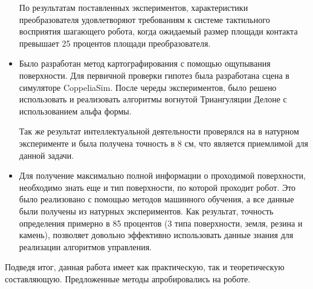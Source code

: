 \begin{itemize}
  По результатам поставленных экспериментов, характеристики преобразователя удовлетворяют требованиям к системе тактильного восприятия шагающего робота, когда ожидаемый размер площади контакта превышает 25 процентов площади преобразователя.
  \item Было разработан метод картографирования с помощью ощупывания поверхности. Для первичной проверки гипотез была разработана сцена в симуляторе CoppeliaSim. После череды экспериментов, было решено использовать и реализовать алгоритмы вогнутой Триангуляции Делоне с использованием альфа формы.

  Так же результат интеллектуальной деятельности проверялся на в натурном эксперименте и была получена точность в 8 см, что является приемлимой для данной задачи.
  \item Для получение максимально полной информации о проходимой поверхности, необходимо знать еще и тип поверхности, по которой проходит робот. Это было реализовано с помощью методов машинного обучения, а все данные были получены из натурных экспериментов. Как результат, точность определения примерно в 85 процентов (3 типа поверхности, земля, резина и камень), позволяет довольно эффективно использовать данные знания для реализации алгоритмов управления.
\end{itemize}

Подведя итог, данная работа имеет как практическую, так и теоретическую составляющую. Предложенные методы апробировались на роботе.